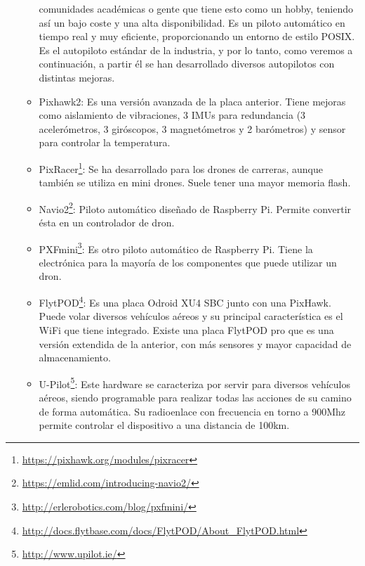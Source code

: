 \begin{itemize}
\begin{itemize}
comunidades académicas o gente que tiene esto como un hobby, teniendo así
un bajo coste y una alta disponibilidad. Es un piloto automático en tiempo real
y muy eficiente, proporcionando un entorno de estilo POSIX. Es el autopiloto
estándar de la industria, y por lo tanto, como veremos a continuación, a partir
él se han desarrollado diversos autopilotos con distintas mejoras.
	\item Pixhawk2: Es una versión avanzada de la placa anterior. Tiene mejoras
como aislamiento de vibraciones, 3 IMUs para redundancia (3 acelerómetros,
3 giróscopos, 3 magnetómetros y 2 barómetros) y sensor para controlar la
temperatura.
	\item PixRacer\footnote{\url{https://pixhawk.org/modules/pixracer}}: Se ha desarrollado para los drones de carreras, aunque también se
utiliza en mini drones. Suele tener una mayor memoria flash.
	\item Navio2\footnote{\url{https://emlid.com/introducing-navio2/}}: Piloto automático diseñado de Raspberry Pi. Permite convertir ésta
en un controlador de dron.
	\item PXFmini\footnote{\url{http://erlerobotics.com/blog/pxfmini/}}: Es otro piloto automático de Raspberry Pi. Tiene la electrónica
para la mayoría de los componentes que puede utilizar un dron.
	\item FlytPOD\footnote{\url{http://docs.flytbase.com/docs/FlytPOD/About_FlytPOD.html}}: Es una placa Odroid XU4 SBC junto con una PixHawk. Puede
volar diversos vehículos aéreos y su principal característica es el WiFi que tiene
integrado. Existe una placa FlytPOD pro que es una versión extendida de la
anterior, con más sensores y mayor capacidad de almacenamiento.
	\item U-Pilot\footnote{\url{http://www.upilot.ie/}}: Este hardware se caracteriza por servir para diversos vehículos aéreos,
siendo programable para realizar todas las acciones de su camino de forma
automática. Su radioenlace con frecuencia en torno a 900Mhz permite controlar
el dispositivo a una distancia de 100km.
	\end{itemize}

\end{itemize}

